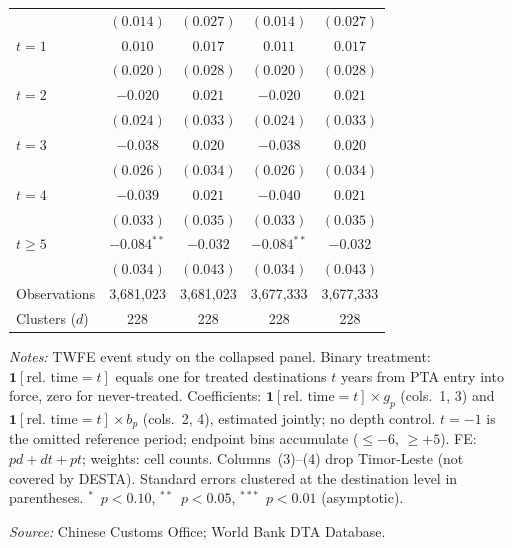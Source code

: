 \begin{table}[p]
\begin{threeparttable}
\begin{tabular}{lcccc}
       & $(0.014)$       & $(0.027)$       & $(0.014)$       & $(0.027)$       \\[1pt]
$t=1$  & $0.010$         & $0.017$         & $0.011$         & $0.017$         \\
       & $(0.020)$       & $(0.028)$       & $(0.020)$       & $(0.028)$       \\[1pt]
$t=2$  & $-0.020$        & $0.021$         & $-0.020$        & $0.021$         \\
       & $(0.024)$       & $(0.033)$       & $(0.024)$       & $(0.033)$       \\[1pt]
$t=3$  & $-0.038$        & $0.020$         & $-0.038$        & $0.020$         \\
       & $(0.026)$       & $(0.034)$       & $(0.026)$       & $(0.034)$       \\[1pt]
$t=4$  & $-0.039$        & $0.021$         & $-0.040$        & $0.021$         \\
       & $(0.033)$       & $(0.035)$       & $(0.033)$       & $(0.035)$       \\[1pt]
$t\geq5$  & $-0.084^{**}$   & $-0.032$        & $-0.084^{**}$   & $-0.032$        \\
       & $(0.034)$       & $(0.043)$       & $(0.034)$       & $(0.043)$       \\[1pt]
\midrule
Observations   & 3,681,023 & 3,681,023 & 3,677,333 & 3,677,333 \\
Clusters ($d$) & 228       & 228       & 228       & 228       \\
\bottomrule
\end{tabular}
\begin{tablenotes}[flushleft]\footnotesize
\item \emph{Notes:} TWFE event study on the collapsed panel. Binary treatment: $\mathbf{1}[\text{rel.\ time}=t]$ equals one for treated destinations $t$ years from PTA entry into force, zero for never-treated. Coefficients: $\mathbf{1}[\text{rel.\ time}=t] \times g_p$ (cols.\ 1, 3) and $\mathbf{1}[\text{rel.\ time}=t] \times b_p$ (cols.\ 2, 4), estimated jointly; no depth control. $t=-1$ is the omitted reference period; endpoint bins accumulate ($\leq -6$, $\geq +5$). FE: $pd + dt + pt$; weights: cell counts. Columns~(3)--(4) drop Timor-Leste (not covered by DESTA). Standard errors clustered at the destination level in parentheses. $^{*}$~$p<0.10$, $^{**}$~$p<0.05$, $^{***}$~$p<0.01$ (asymptotic).
\item \textit{Source:} Chinese Customs Office; World Bank DTA Database.
\end{tablenotes}
\end{threeparttable}
\end{table}
